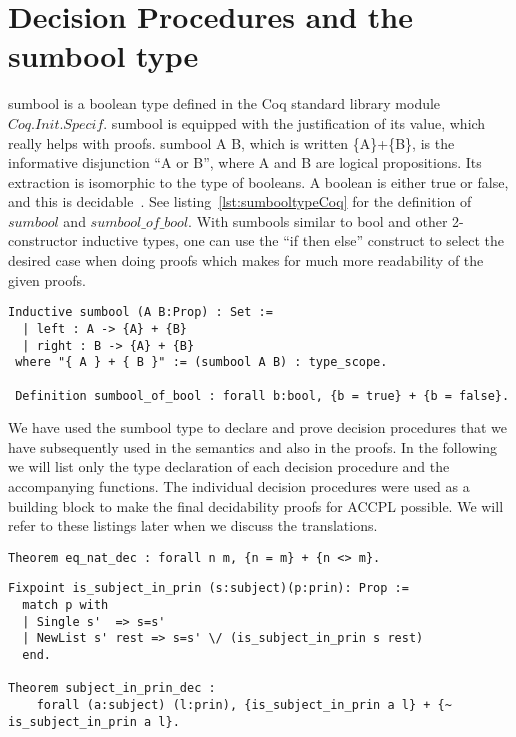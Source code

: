 \section{Decision Procedures and the sumbool type}

sumbool is a boolean type defined in the Coq standard library module $Coq.Init.Specif$. sumbool is equipped with the justification of its value, which really helps with proofs. sumbool A B, which is written \{A\}+\{B\}, is the informative disjunction ``A or B'', where A and B are logical propositions. Its extraction is isomorphic to the type of booleans. A boolean is either true or false, and this is decidable~\cite{Coq:manual}. See listing~\ref{lst:sumbooltypeCoq} for the definition of $sumbool$ and $sumbool\_of\_bool$. With sumbools similar to bool and other 2-constructor inductive types, one can use the ``if then else'' construct to select the desired case when doing proofs which makes for much more readability of the given proofs.

\begin{minipage}[c]{0.95\textwidth}
\begin{lstlisting}
Inductive sumbool (A B:Prop) : Set :=
  | left : A -> {A} + {B}
  | right : B -> {A} + {B}
 where "{ A } + { B }" := (sumbool A B) : type_scope.
 
 Definition sumbool_of_bool : forall b:bool, {b = true} + {b = false}.
\end{lstlisting}
\end{minipage}

We have used the sumbool type to declare and prove decision procedures that we have subsequently used in the semantics and also in the proofs. In the following we will list only the type declaration of each decision procedure and the accompanying functions. The individual decision procedures were used as a building block to make the final decidability proofs for \ac{ACCPL} possible. We will refer to these listings later when we discuss the translations.

\begin{lstlisting}
Theorem eq_nat_dec : forall n m, {n = m} + {n <> m}.
\end{lstlisting}


\begin{lstlisting}
Fixpoint is_subject_in_prin (s:subject)(p:prin): Prop :=
  match p with
  | Single s'  => s=s'
  | NewList s' rest => s=s' \/ (is_subject_in_prin s rest)
  end.

Theorem subject_in_prin_dec :
    forall (a:subject) (l:prin), {is_subject_in_prin a l} + {~ is_subject_in_prin a l}.

\end{lstlisting}

